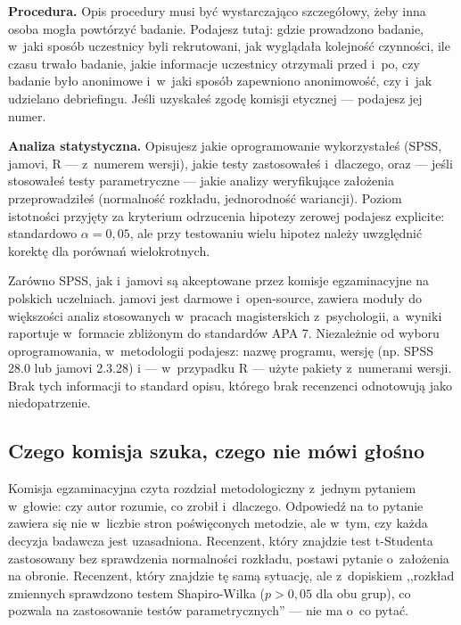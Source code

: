 \documentclass[12pt,a4paper,twoside,openany]{book}
\begin{document}
\textbf{Procedura.} Opis procedury musi być wystarczająco szczegółowy, żeby inna osoba mogła powtórzyć badanie. Podajesz tutaj: gdzie prowadzono badanie, w~jaki sposób uczestnicy byli rekrutowani, jak wyglądała kolejność czynności, ile czasu trwało badanie, jakie informacje uczestnicy otrzymali przed i~po, czy badanie było anonimowe i~w~jaki sposób zapewniono anonimowość, czy i~jak udzielano debriefingu. Jeśli uzyskałeś zgodę komisji etycznej --- podajesz jej numer.

\textbf{Analiza statystyczna.} Opisujesz jakie oprogramowanie wykorzystałeś (SPSS, jamovi, R --- z~numerem wersji), jakie testy zastosowałeś i~dlaczego, oraz --- jeśli stosowałeś testy parametryczne --- jakie analizy weryfikujące założenia przeprowadziłeś (normalność rozkładu, jednorodność wariancji). Poziom istotności przyjęty za kryterium odrzucenia hipotezy zerowej podajesz explicite: standardowo $\alpha = 0{,}05$, ale przy testowaniu wielu hipotez należy uwzględnić korektę dla porównań wielokrotnych.

\begin{tipbox}
Zarówno SPSS, jak i~jamovi są akceptowane przez komisje egzaminacyjne na polskich uczelniach. jamovi jest darmowe i~open-source, zawiera moduły do większości analiz stosowanych w~pracach magisterskich z~psychologii, a~wyniki raportuje w~formacie zbliżonym do standardów APA 7. Niezależnie od wyboru oprogramowania, w~metodologii podajesz: nazwę programu, wersję (np. SPSS 28.0 lub jamovi 2.3.28) i --- w~przypadku R --- użyte pakiety z~numerami wersji. Brak tych informacji to standard opisu, którego brak recenzenci odnotowują jako niedopatrzenie.
\end{tipbox}

\subsection{Czego komisja szuka, czego nie mówi głośno}

Komisja egzaminacyjna czyta rozdział metodologiczny z~jednym pytaniem w~głowie: czy autor rozumie, co zrobił i~dlaczego. Odpowiedź na to pytanie zawiera się nie w~liczbie stron poświęconych metodzie, ale w~tym, czy każda decyzja badawcza jest uzasadniona. Recenzent, który znajdzie test t-Studenta zastosowany bez sprawdzenia normalności rozkładu, postawi pytanie o~założenia na obronie. Recenzent, który znajdzie tę samą sytuację, ale z~dopiskiem ,,rozkład zmiennych sprawdzono testem Shapiro-Wilka ($p > 0{,}05$ dla obu grup), co pozwala na zastosowanie testów parametrycznych'' --- nie ma o~co pytać.
\end{document}

